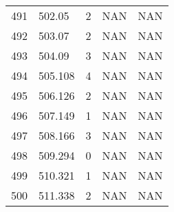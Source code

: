 \documentclass{article}
\begin{document}
\begin{longtable}{@{}lllll@{}}
					491 & 502.05  & 2     & NAN   & NAN   \\
					492 & 503.07  & 2     & NAN   & NAN   \\
					493 & 504.09  & 3     & NAN   & NAN   \\
					494 & 505.108 & 4     & NAN   & NAN   \\
					495 & 506.126 & 2     & NAN   & NAN   \\
					496 & 507.149 & 1     & NAN   & NAN   \\
					497 & 508.166 & 3     & NAN   & NAN   \\
					498 & 509.294 & 0     & NAN   & NAN   \\
					499 & 510.321 & 1     & NAN   & NAN   \\
					500 & 511.338 & 2     & NAN   & NAN   \\* \bottomrule
				\end{longtable}
		
\end{document}
